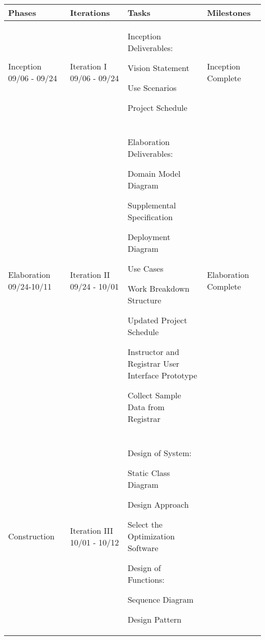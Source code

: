\documentclass[11pt]{article}
\newenvironment{packed_itemize}{
\begin{itemize}
  \setlength{\itemsep}{1pt}
  \setlength{\parskip}{0pt}
  \setlength{\parsep}{0pt}
}{\end{itemize}}
\begin{document}
\centering %
\begin{tabular}{|m{0.9in}|m{0.9in}|m{3.2in}|m{.9in}|}
\hline
\textbf{Phases}  & \textbf{Iterations}  & \textbf{Tasks}        & \textbf{Milestones} \\
\hline\hline
 Inception 09/06 - 09/24
   &  Iteration I 09/06 - 09/24  
	& Inception Deliverables:
	 \begin{packed_itemize} 
	\vspace{-0.15in}
		\item Vision Statement
		\item Use Scenarios
		\item Project Schedule
	\end{packed_itemize}
	\vspace{-0.4in}
	& Inception Complete\\
   &        & & \\
\hline
Elaboration 09/24-10/11& 
Iteration II 09/24 - 10/01& 
Elaboration Deliverables: 
	 \begin{packed_itemize} 
	\vspace{-0.15in}
		\item Domain Model Diagram
		\item Supplemental Specification
		\item Deployment Diagram
		\item Use Cases
		\item Work Breakdown Structure
		\item Updated Project Schedule
   \end{packed_itemize}

\raggedright{
Instructor and Registrar User Interface Prototype
}
\vspace{0.1in}

Collect Sample Data from Registrar
& Elaboration Complete
\\
& & & \\
\hline

\multirow{10}{*}{Construction }
 &
 Iteration III 10/01 - 10/12 &
 Design of System:
	\begin{packed_itemize}
		\vspace{-0.15in}
		\item Static Class Diagram
		\item Design Approach
		\item Select the Optimization Software
	\end{packed_itemize}

 Design of Functions:
	\begin{packed_itemize}
		\vspace{-0.15in}
		\item Sequence Diagram
		\item  Design Pattern
	\end{packed_itemize}


\end{tabular}
\end{document}

